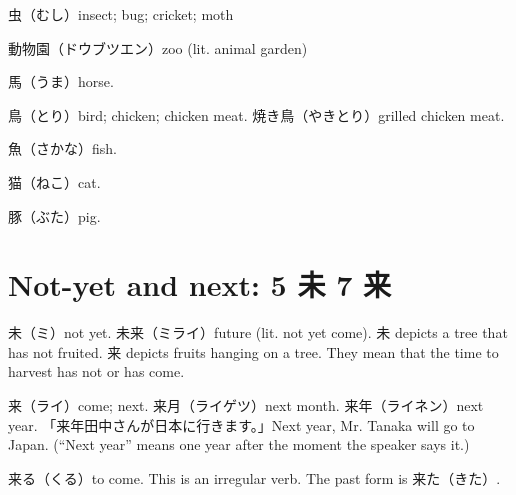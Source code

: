 虫（むし）insect; bug; cricket; moth

動物園（ドウブツエン）zoo (lit. animal garden)

馬（うま）horse.

鳥（とり）bird; chicken; chicken meat.
焼き鳥（やきとり）grilled chicken meat.

魚（さかな）fish.

猫（ねこ）cat.

豚（ぶた）pig.

\section{Not-yet and next: 5 未 7 来}

未（ミ）not yet.
未来（ミライ）future (lit. not yet come).
未 depicts a tree that has not fruited.
来 depicts fruits hanging on a tree.
They mean that the time to harvest has not or has come.

来（ライ）come; next.
来月（ライゲツ）next month.
来年（ライネン）next year.
「来年田中さんが日本に行きます。」Next year, Mr. Tanaka will go to Japan.
(``Next year'' means one year after the moment the speaker says it.)

来る（くる）to come.
This is an irregular verb.
The past form is 来た（きた）.
